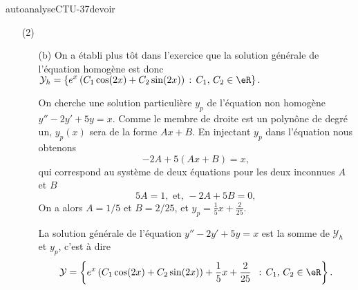 
\begin{corrige}{autoanalyseCTU-37devoir}
 \begin{enumerate}
   \item[(2)] \begin{enumerate}
  \item[(b)] On a établi plus t\^ot dans l'exercice que la solution générale de l'équation homogène est donc $\displaystyle \mathcal{Y}_h  = \left\{ e^{x}\left(C_1\cos(2x) +C_2\sin(2x)\right)  \,:\, C_1,\, C_2 \in \eR \right\}.$

On cherche une solution particulière $y_p$ de l'équation non homogène $y''-2y'+5y=x$. Comme le membre de droite est un polyn\^one de degré un, $y_p(x)$ sera  de la forme $Ax + B$. En injectant $y_p$ dans l'équation nous obtenons 
\begin{equation*}
  -2A + 5\left(Ax+B\right) = x,
\end{equation*}
qui correspond au système de deux équations pour les deux inconnues $A$ et $B$
\begin{equation*}
    5A =1 ,\text{ et, }-2A +5B = 0,
\end{equation*}
On a alors $A=1/5$ et $B=2/25$, et $y_p = \displaystyle \frac{1}{5}x +\frac{2}{25}$.

La solution générale de l'équation  $y''-2y'+5y=x$ est la somme de $\mathcal{Y}_h$ et $y_p$, c'est à dire 
\begin{equation*}
  \mathcal{Y} = \left\{ e^{x}\left(C_1\cos(2x) +C_2\sin(2x)\right)+ \frac{1}{5}x +\frac{2}{25} \ \,:\, C_1,\, C_2 \in \eR \right\}.
\end{equation*}


\end{enumerate}
\end{enumerate}
\end{corrige}
